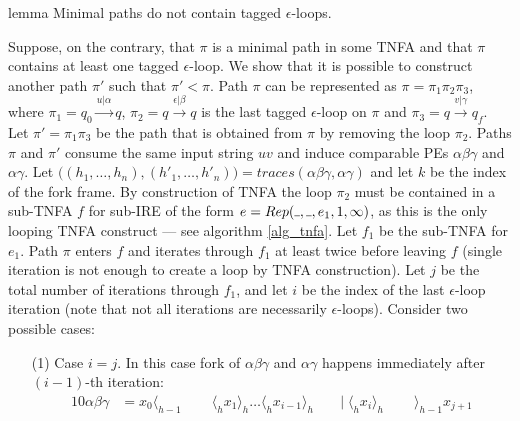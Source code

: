 \documentclass[AMA,STIX1COL]{WileyNJD-v2}
\newcommand{\Xl}{\langle}
\newcommand{\Xr}{\rangle}
\newcommand{\Xund}{\rule{.4em}{.4pt}}
\newcommand{\Rep}{Rep}
\begin{document}
\begin{theoremEnd}[restate, no link to proof, no link to theorem, category=lemmata_closure]{lemma}
    \label{lemma_closure_minpaths}
    Minimal paths do not contain tagged $\epsilon$-loops.
\end{theoremEnd}
\begin{proofEnd}
    Suppose, on the contrary, that $\pi$ is a minimal path in some TNFA
    and that $\pi$ contains at least one tagged $\epsilon$-loop.
    We show that it is possible to construct another path $\pi'$ such that $\pi' < \pi$.
    Path $\pi$ can be represented as
    $\pi = \pi_1 \pi_2 \pi_3$, where
    $\pi_1 = q_0 \overset {u | \alpha} {\longrightarrow} q$,
    $\pi_2 = q \overset {\epsilon | \beta} {\longrightarrow} q$ is the last tagged $\epsilon$-loop on $\pi$ and
    $\pi_3 = q \overset {v | \gamma} {\longrightarrow} q_f$.
    Let $\pi' = \pi_1 \pi_3$ be the path that is obtained from $\pi$ by removing the loop $\pi_2$.
    Paths $\pi$ and $\pi'$ consume the same input string $uv$
    and induce comparable PEs $\alpha \beta \gamma$ and $\alpha \gamma$.
    Let $\big( (h_1, \hdots, h_n), (h'_1, \hdots, h'_n) \big) = traces (\alpha \beta \gamma, \alpha \gamma)$
    and let $k$ be the index of the fork frame.
    By construction of TNFA the loop $\pi_2$ must be contained in a sub-TNFA $f$
    for sub-IRE of the form $e = \Rep(\Xund, \Xund, e_1, 1, \infty)$,
    as this is the only looping TNFA construct --- see algorithm \ref{alg_tnfa}.
    Let $f_1$ be the sub-TNFA for $e_1$.
    Path $\pi$ enters $f$ and iterates through $f_1$ at least twice before leaving $f$
    (single iteration is not enough to create a loop by TNFA construction).
    Let $j$ be the total number of iterations through $f_1$,
    and let $i$ be the index of the last $\epsilon$-loop iteration
    (note that not all iterations are necessarily $\epsilon$-loops).
    Consider two possible cases:
    \begin{enumerate}[itemsep=0.2em, topsep=0.5em]
    \item[(1)]
        Case $i = j$.
        In this case fork of $\alpha \beta \gamma$ and $\alpha \gamma$ happens immediately after $(i-1)$-th iteration:
        \begin{alignat*}{10}
            \alpha \beta \gamma &= x_0 \Xl_{h-1} \;&&\; \Xl_h x_1 \Xr_h \hdots \Xl_h x_{i-1} \Xr_h \;&&\big|\; \Xl_h x_{i} \Xr_h \;&&\; \Xr_{h-1} x_{j+1} \\[-0.5em]

\end{alignat*}
\end{enumerate}
\end{proofEnd}
\end{document}
